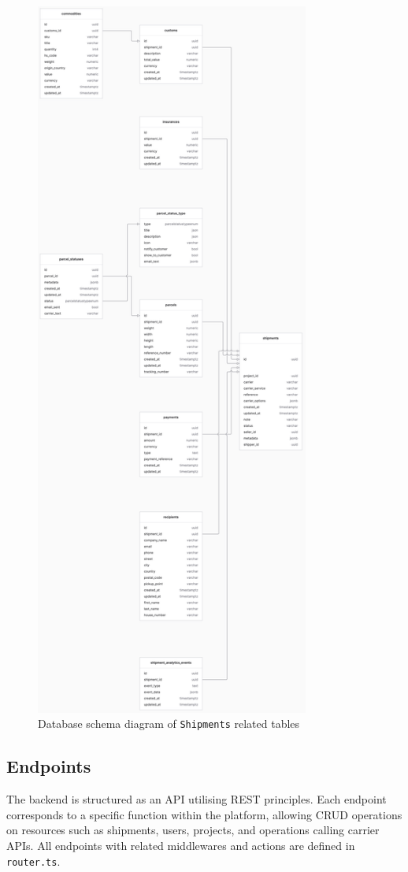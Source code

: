 \begin{figure}[H]\centering
\includegraphics[width=90mm]{img/docs/fig_db_schema_shipments.png}
\caption{Database schema diagram of \texttt{Shipments} related tables}
\label{imgdocs:db-schema-shipments}
\end{figure}
\subsection{Endpoints}
The backend is structured as an API utilising REST principles.
Each endpoint corresponds to a specific function within the platform, allowing \ac{CRUD} operations on resources such as shipments, users, projects, and operations calling carrier APIs. 
All endpoints with related middlewares and actions are defined in \texttt{router.ts}.

